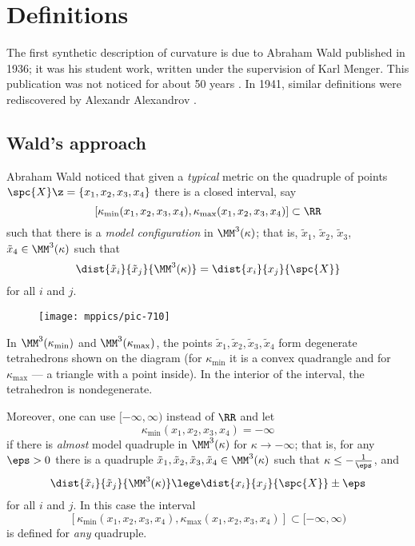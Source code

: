 \chapter{Definitions}

The first synthetic description of curvature is due to Abraham Wald \cite{wald} published in 1936;
it was his student work, written under the supervision of Karl Menger. 
This publication was not noticed for about 50 years \cite{berestovskii}.
In 1941, similar definitions were rediscovered by Alexandr Alexandrov \cite{alexandrov:def}.



\section{Wald's approach}

Abraham Wald noticed that given a \textit{typical} metric on the quadruple of points $\spc{X}\z=\{x_1,x_2,x_3,x_4\}$ there is a closed interval,
say 
\[[\kappa_{\min}(x_1,x_2,x_3,x_4),\kappa_{\max}(x_1,x_2,x_3,x_4)]\subset \RR\]
such that there is a \emph{model configuration} in $\MM^3(\kappa)$;
that is, $\tilde x_1$, $\tilde x_2$, $\tilde x_3$, $\tilde x_4\in\MM^3(\kappa)$ such that
\[\dist{\tilde x_i}{\tilde x_j}{\MM^3(\kappa)}=\dist{x_i}{x_j}{\spc{X}}\]
for all $i$ and $j$.


\begin{wrapfigure}{r}{33mm}
\vskip-2mm
\centering
\texttt{[image: mppics/pic-710]}
\end{wrapfigure}

In $\MM^3(\kappa_{\min})$ and $\MM^3(\kappa_{\max})$, the points $\tilde x_1,\tilde x_2,\tilde x_3,\tilde x_4$ form degenerate tetrahedrons shown on the diagram (for $\kappa_{\min}$ it is a convex quadrangle and for $\kappa_{\max}$ --- a triangle with a point inside).
In the interior of the interval, the tetrahedron is nondegenerate.

Moreover, one can use $[-\infty,\infty)$ instead of $\RR$ 
and let
\[\kappa_{\min}(x_1,x_2,x_3,x_4)=-\infty\]
if there is \textit{almost} model quadruple in
$\MM^3(\kappa)$ for $\kappa\to -\infty$;
that is, for any $\eps>0$ there is a quadruple
$\tilde x_1,\tilde x_2,\tilde x_3,\tilde x_4\in\MM^3(\kappa)$
such that $\kappa\le -\tfrac1\eps$, and
\[\dist{\tilde x_i}{\tilde x_j}{\MM^3(\kappa)}\lege\dist{x_i}{x_j}{\spc{X}}\pm\eps\]
for all $i$ and $j$.
In this case the interval 
\[[\kappa_{\min}(x_1,x_2,x_3,x_4),\kappa_{\max}(x_1,x_2,x_3,x_4)]\subset [-\infty,\infty)\]
is defined for \textit{any} quadruple.


